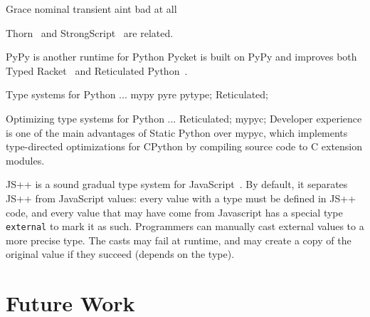 \documentclass[english,cleveref,submission]{programming}
\newcommand{\SP}{Static Python}
\newcommand{\code}[1]{\texttt{#1}}
\begin{document}
Grace nominal transient aint bad at all

Thorn~\cite{wnlov-popl-2010} and StrongScript~\cite{rzv-ecoop-2015} are related.

PyPy is another runtime for Python
Pycket is built on PyPy and improves both Typed Racket~\cite{bbst-oopsla-2017}
and Reticulated Python~\cite{vsc-dls-2019}.

Type systems for Python ...
mypy pyre pytype;
Reticulated;

Optimizing type systems for Python ...
Reticulated;
mypyc;
Developer experience is one of the main advantages of \SP{} over mypyc,
which implements type-directed optimizations for CPython
by compiling source code to C extension modules.

JS++ is a sound gradual type system for JavaScript~\cite{jspp}.
By default, it separates JS++ from JavaScript values:
every value with a type must be defined in JS++ code,
and every value that may have come from Javascript has
a special type \code{external} to mark it as such.
Programmers can manually cast external values to a
more precise type.
The casts may fail at runtime, and may create a copy of
the original value if they succeed (depends on the type).


\section{Future Work}
\label{s:future}



\end{document}
